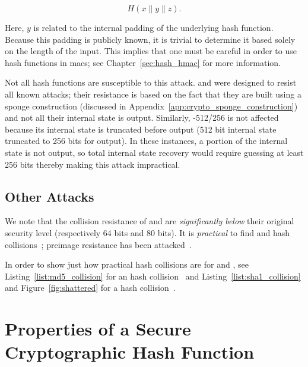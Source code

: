 \begin{equation}
    H(x\|y\|z).
\end{equation}

\noindent
Here, $y$ is related to the internal padding of the underlying
\gls{hash function}.
Because this padding is publicly known,
it is trivial to determine it based solely on the length of the input.
This implies that one must be careful in order to use
\glspl{hash function} in \glspl{mac};
see Chapter~\ref{sec:hash_hmac} for more information.

Not all \glspl{hash function} are susceptible to this attack.
\Keccak{} and \ShaThree{} were designed to resist all known attacks;
their resistance is based on the fact that they are built
using a sponge construction
(discussed in Appendix~\ref{app:crypto_sponge_construction})
and not all their internal state is output.
Similarly, \ShaTwo{}-512/256 is not affected because its internal state
is truncated before output
(512 bit internal state truncated to 256 bits for output).
In these instances, a portion of the internal state is not output,
so total internal state recovery would require guessing at least 256 bits
thereby making this attack impractical.

\subsection{Other Attacks}

We note that the collision resistance of \MDFive{} and \ShaOne{}
are \emph{significantly below} their original security level
(respectively 64 bits and 80 bits).
It is \emph{practical} to find \MDFive{} and \ShaOne{} hash
collisions~\cite{cryptoeprint:2004:199,cryptoeprint:2005:067,
cryptoeprint:2004:356,cryptoeprint:2020:014,rfc6151,rfc6194};
preimage resistance has been attacked~\cite{MD5FastPreimage2009}.

In order to show just how practical hash collisions are
for \MDFive{} and \ShaOne{},
see Listing~\ref{list:md5_collision}
for an \MDFive{} hash collision~\cite{md5Collision}
and Listing~\ref{list:sha1_collision} and Figure~\ref{fig:shattered}
for a \ShaOne{} hash collision~\cite{sha1Collision}.






\section{Properties of a Secure Cryptographic Hash Function}


